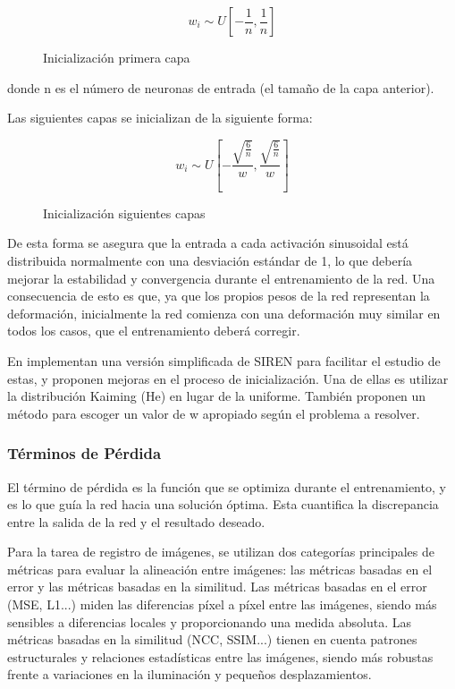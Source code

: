 \begin{figure}[tbp]
    \centering
    \[
    w_i \sim U\left[ -\frac{1}{n}, \frac{1}{n} \right]
    \]

\caption{Inicialización primera capa}
\end{figure}

donde n es el número de neuronas de entrada (el tamaño de la capa anterior).

Las siguientes capas se inicializan de la siguiente forma:
\begin{figure}[tbp]
    \centering
    \[
    w_i \sim U\left[ -\frac{\sqrt{\frac{6}{n}}}{w}, \frac{\sqrt{\frac{6}{n}}}{w} \right]
    \]
    \caption{Inicialización siguientes capas}
\end{figure}

De esta forma se asegura que la entrada a cada activación sinusoidal está distribuida normalmente con una desviación estándar de 1,
lo que debería mejorar la estabilidad y convergencia durante el entrenamiento de la red.
Una consecuencia de esto es que, ya que los propios pesos de la red representan la deformación, inicialmente la red comienza con una deformación muy similar en todos los casos, que el entrenamiento deberá corregir.

En \cite{sireninit} implementan una versión simplificada de SIREN para facilitar el estudio de estas,
y proponen mejoras en el proceso de inicialización. Una de ellas es utilizar la distribución Kaiming (He) en lugar de la uniforme.
También proponen un método para escoger un valor de w apropiado según el problema a resolver.

\subsubsection{Términos de Pérdida}\label{subsubsec:Termos de Perda}

El término de pérdida es la función que se optimiza durante el entrenamiento, y es lo que guía la red hacia una solución óptima.
Esta cuantifica la discrepancia entre la salida de la red y el resultado deseado.

Para la tarea de registro de imágenes, se utilizan dos categorías principales de métricas para evaluar la alineación entre imágenes:
las métricas basadas en el error y las métricas basadas en la similitud. Las métricas basadas en el error (MSE, L1...) miden las diferencias píxel a píxel entre las imágenes,
siendo más sensibles a diferencias locales y proporcionando una medida absoluta.
Las métricas basadas en la similitud (NCC, SSIM...) tienen en cuenta patrones estructurales y relaciones estadísticas entre las imágenes, siendo más robustas frente a variaciones en la iluminación y pequeños desplazamientos.
\cite{simmetric}

